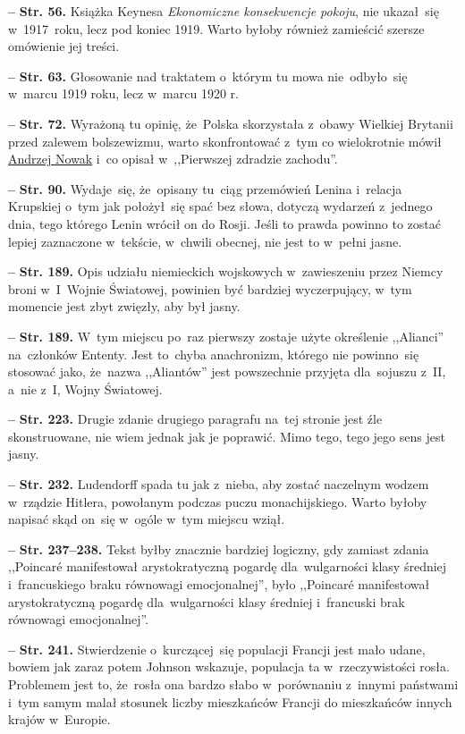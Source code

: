 \documentclass[a4paper,11pt]{article}
\newcommand{\tb}{\textbf}
\newcommand{\noi}{\noindent}
\newcommand{\start}{\noi \tb{--} {}}
\newcommand{\Str}[1]{\tb{Str. #1.}}
\begin{document}
\start \Str{56} Książka Keynesa \emph{Ekonomiczne konsekwencje
  pokoju}, nie ukazał~się w~1917~roku, lecz pod koniec 1919. Warto
byłoby również zamieścić szersze omówienie jej treści.

\start \Str{63} Głosowanie nad traktatem o~którym tu mowa
nie~odbyło~się w~marcu 1919 roku, lecz w~marcu 1920 r.

\start \Str{72} Wyrażoną tu opinię, że~Polska skorzystała z~obawy
Wielkiej Brytanii przed zalewem bolszewizmu, warto skonfrontować z~tym
co wielokrotnie mówił
\href{https://www.youtube.com/watch?v=yfQ7rpq_irA}{Andrzej Nowak} i~co
opisał w~,,Pierwszej zdradzie zachodu''.

\start \Str{90} Wydaje~się, że~opisany tu~ciąg przemówień Lenina
i~relacja Krupskiej o~tym jak położył~się spać bez słowa, dotyczą
wydarzeń z~jednego dnia, tego którego Lenin wrócił on do Rosji. Jeśli
to prawda powinno to zostać lepiej zaznaczone w~tekście, w~chwili
obecnej, nie jest to w~pełni jasne.

\start \Str{189} Opis udziału niemieckich wojskowych w~zawieszeniu
przez Niemcy broni w~I~Wojnie Światowej, powinien być bardziej
wyczerpujący, w~tym momencie jest zbyt zwięzły, aby był jasny.

\start \Str{189} W~tym miejscu po~raz pierwszy zostaje użyte
określenie ,,Alianci'' na~członków Ententy. Jest to~chyba anachronizm,
którego nie powinno~się stosować jako, że~nazwa ,,Aliantów'' jest
powszechnie przyjęta dla~sojuszu z~II, a~nie z~I, Wojny Światowej.

\start \Str{223} Drugie zdanie drugiego paragrafu na~tej stronie jest
źle skonstruowane, nie wiem jednak jak je poprawić. Mimo tego, tego
jego sens jest jasny.

\start \Str{232} Ludendorff spada tu jak z~nieba, aby zostać naczelnym
wodzem w~rządzie Hitlera, powołanym podczas puczu monachijskiego.
Warto byłoby napisać skąd on~się w~ogóle w~tym miejscu wziął.

\start \Str{237--238} Tekst byłby znacznie bardziej logiczny, gdy
zamiast zdania ,,Poincar\'{e} manifestował arystokratyczną pogardę
dla~wulgarności klasy średniej i~francuskiego braku równowagi
emocjonalnej'', było ,,Poincar\'{e} manifestował arystokratyczną
pogardę dla~wulgarności klasy średniej i~francuski brak równowagi
emocjonalnej''.

\start \Str{241} Stwierdzenie o~kurczącej~się populacji Francji jest
mało udane, bowiem jak zaraz potem Johnson wskazuje, populacja ta
w~rzeczywistości rosła. Problemem jest to, że~rosła ona bardzo słabo
w~porównaniu z~innymi państwami i~tym samym malał stosunek liczby
mieszkańców Francji do mieszkańców innych krajów w~Europie.
\end{document}
